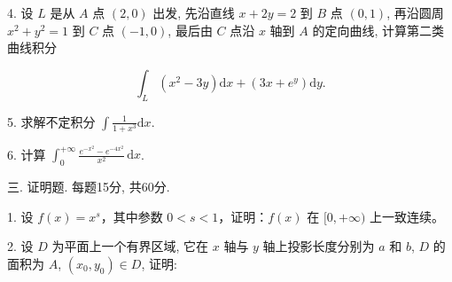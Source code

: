 \documentclass{examcollection}
\renewcommand{\displayformula}[1]{\[#1\]}
\begin{document}
{\begin{minipage}{\textwidth}
4. 设 $L$ 是从 $A$ 点 $(2,0)$ 出发, 先沿直线 $x + 2y = 2$ 到 $B$ 点 $(0,1)$, 再沿圆周 $x^{2} + y^{2} = 1$ 到 $C$ 点 $(-1,0)$, 最后由 $C$ 点沿 $x$ 轴到 $A$ 的定向曲线, 计算第二类曲线积分\par
\displayformula{\int_ {L} (x ^ {2} - 3 y) \mathrm{d} x + (3 x + e ^ {y}) \mathrm{d} y.}\par
5. 求解不定积分 $\int \frac{1}{1 + x^3} \mathrm{d}x$.\par
6. 计算 $\int_0^{+\infty} \frac{e^{-x^2} - e^{-4x^2}}{x^2} \, \mathrm{d}x$.\par
三. 证明题. 每题15分, 共60分.\par
1. 设 $f(x) = x^s$，其中参数 $0 < s < 1$，证明：$f(x)$ 在 $[0, +\infty)$ 上一致连续。\par
2. 设 $D$ 为平面上一个有界区域, 它在 $x$ 轴与 $y$ 轴上投影长度分别为 $a$ 和 $b$, $D$ 的面积为 $A$, $(x_0, y_0) \in D$, 证明:\par
\end{minipage}}
\ifdim\dimexpr\ht\proofbox+\dp\proofbox\relax>\textheight
\noindent\resizebox{!}{\textheight}{\usebox{\proofbox}}\else\noindent\usebox{\proofbox}\fi\clearpage
\end{document}
